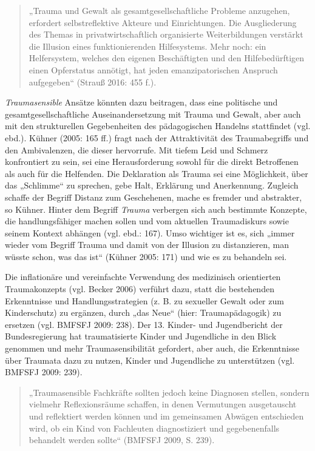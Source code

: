 \begin{quote}
\small{„Trauma und Gewalt als gesamtgesellschaftliche Probleme anzugehen, erfordert selbstreflektive Akteure und Einrichtungen. Die Ausgliederung des Themas in privatwirtschaftlich organisierte Weiterbildungen verstärkt die Illusion eines funktionierenden Hilfesystems. Mehr noch: ein Helfersystem, welches den eigenen Beschäftigten und den Hilfebedürftigen einen Opferstatus annötigt, hat jeden emanzipatorischen Anspruch aufgegeben“ (Strauß 2016: 455 f.).}
\end{quote}

\textit{Traumasensible} Ansätze könnten dazu beitragen, dass eine politische und gesamtgesellschaftliche Auseinandersetzung mit Trauma und Gewalt, aber auch mit den strukturellen Gegebenheiten des pädagogischen Handelns stattfindet (vgl. ebd.). Kühner (2005: 165 ff.) fragt nach der Attraktivität des Traumabegriffs und den Ambivalenzen, die dieser hervorrufe. Mit tiefem Leid und Schmerz konfrontiert zu sein, sei eine Herausforderung sowohl für die direkt Betroffenen als auch für die Helfenden. Die Deklaration als Trauma sei eine Möglichkeit, über das „Schlimme“ zu sprechen, gebe Halt, Erklärung und Anerkennung. Zugleich schaffe der Begriff Distanz zum Geschehenen, mache es fremder und abstrakter, so Kühner. Hinter dem Begriff \textit{Trauma} verbergen sich auch bestimmte Konzepte, die handlungsfähiger machen sollen und vom aktuellen Traumadiskurs sowie seinem Kontext abhängen (vgl. ebd.: 167). Umso wichtiger ist es, sich „immer wieder vom Begriff Trauma und damit von der Illusion zu distanzieren, man wüsste schon, was das ist“ (Kühner 2005: 171) und wie es zu behandeln sei.

Die inflationäre und vereinfachte Verwendung des medizinisch orientierten Traumakonzepts (vgl. Becker 2006) verführt dazu, statt die bestehenden Erkenntnisse und Handlungsstrategien (z. B. zu sexueller Gewalt oder zum Kinderschutz) zu ergänzen, durch „das Neue“ (hier: Traumapädagogik) zu ersetzen (vgl. BMFSFJ 2009: 238). Der 13. Kinder- und Jugendbericht der Bundesregierung hat traumatisierte Kinder und Jugendliche in den Blick genommen und mehr Traumasensibilität gefordert, aber auch, die Erkenntnisse über Traumata dazu zu nutzen, Kinder und Jugendliche zu unterstützen (vgl. BMFSFJ 2009: 239).

\begin{quote}
\small{„Traumasensible Fachkräfte sollten jedoch keine Diagnosen stellen, sondern vielmehr Reflexionsräume schaffen, in denen Vermutungen ausgetauscht und reflektiert werden können und im gemeinsamen Abwägen entschieden wird, ob ein Kind von Fachleuten diagnostiziert und gegebenenfalls behandelt werden sollte“ (BMFSFJ 2009, S. 239).}
\end{quote}

